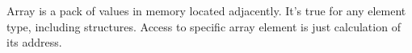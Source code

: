 ﻿%
\ifdefined\RUSSIAN
\else
\section{\Conclusion{}}

Array is a pack of values in memory located adjacently.
It's true for any element type, including structures.
Access to specific array element is just calculation of its address.

\fi
